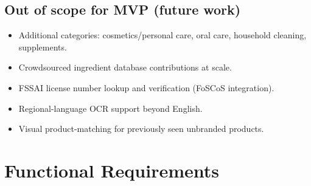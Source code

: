 \documentclass[11pt,a4paper]{article}
\begin{document}
\subsection{Out of scope for MVP (future work)}
\begin{itemize}
  \item Additional categories: cosmetics/personal care, oral care, household cleaning, supplements.
  \item Crowdsourced ingredient database contributions at scale.
  \item FSSAI license number lookup and verification (FoSCoS integration).
  \item Regional-language OCR support beyond English.
  \item Visual product-matching for previously seen unbranded products.
\end{itemize}

\section{Functional Requirements}
\end{document}
